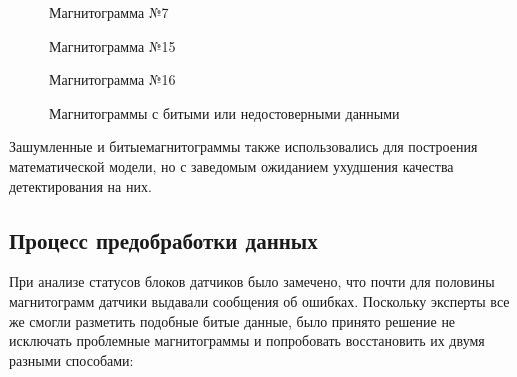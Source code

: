 \documentclass[a4paper,article,14pt]{extarticle}
\begin{document}
\begin{figure}[h!]
\begin{minipage}[h]{0.9\linewidth}
    \end{minipage}
    \vfill
    \begin{minipage}[h]{0.9\linewidth}
     Магнитограмма №7 \\
    \end{minipage}
    \vfill
    \begin{minipage}[h]{0.9\linewidth}
     Магнитограмма №15 \\
    \end{minipage}
    \vfill
    \begin{minipage}[h]{0.9\linewidth}
     Магнитограмма №16 \\
    \end{minipage}
    \caption{Магнитограммы с битыми или недостоверными данными}
    \label{image6}
\end{figure}

Зашумленные и \flqq битые\frqq магнитограммы также использовались для построения математической модели, но с заведомым ожиданием ухудшения качества детектирования на них.

\subsection{Процесс предобработки данных}

При анализе статусов блоков датчиков было замечено, что почти для половины магнитограмм 
датчики выдавали сообщения об ошибках. Поскольку эксперты все же смогли разметить подобные \flqq битые\frqq
данные, было принято решение не исключать проблемные магнитограммы и попробовать восстановить их двумя разными способами:
\end{document}
